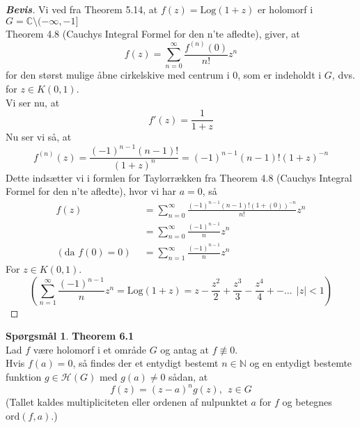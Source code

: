\documentclass[10pt,a4paper]{article}
\theoremstyle{definition}
\newtheorem{Prob}{Spørgsmål}
\begin{document}
\newpage
\begin{proof}[\textbf{Bevis}]
Vi ved fra Theorem 5.14, at $f(z) = \text{Log}(1+z)$ er holomorf i $G = \mathbb{C} \setminus (-\infty,-1]$ \\
Theorem 4.8 (Cauchys Integral Formel for den n'te afledte), giver, at
$$f(z) = \sum_{n=0}^\infty \frac{f^{(n)}(0)}{n!}z^n$$
for den størst mulige åbne cirkelskive med centrum i ${0}$, som er indeholdt i $G$, dvs. for $z \in K(0,1)$. \\
Vi ser nu, at
$$f'(z) = \frac{1}{1+z}$$
Nu ser vi så, at 
$$f^{(n)}(z)= \frac{(-1)^{n-1} (n-1)!}{(1+z)^n} = (-1)^{n-1} (n-1)! (1+z)^{-n}$$
Dette indsætter vi i formlen for Taylorrækken fra Theorem 4.8 (Cauchys Integral Formel for den n'te afledte), hvor vi har $a=0$, så
\begin{align*}
f(z) &= \sum_{n=0}^\infty \frac{(-1)^{n-1} (n-1)! (1+(0))^{-n}}{n!} z^n \\
&= \sum_{n=0}^\infty \frac{(-1)^{n-1}}{n} z^n  \\
(\text{da } f(0)=0) \ \ &= \sum_{n=1}^\infty \frac{(-1)^{n-1}}{n} z^n
\end{align*}
For $z \in K(0,1)$.
$$\left( \sum_{n=1}^\infty \frac{(-1)^{n-1}}{n} z^n = \text{Log}(1+z) = z - \frac{z^2}{2} + \frac{z^3}{3} - \frac{z^4}{4} + - ...  \ \ |z|<1 \right)$$
\end{proof}





\newpage
\begin{Prob}{\textbf{Theorem 6.1}} \\

Lad $f$ være holomorf i et område $G$ og antag at $f \not\equiv 0$. \\
Hvis $f(a)=0$, så findes der et entydigt bestemt $n \in \mathbb{N}$ og en entydigt bestemte funktion $g \in \mathcal{H}(G)$ med $g(a) \neq 0$ sådan, at
\begin{equation}
f(z) = (z-a)^n g(z), \ \ z \in G
\end{equation}
(Tallet kaldes multipliciteten eller ordenen af nulpunktet $a$ for $f$ og betegnes $\text{ord}(f,a)$.)
\end{Prob}
\end{document}
